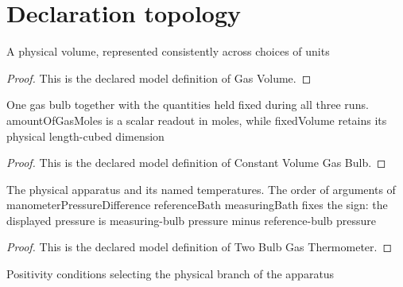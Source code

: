 \section{Declaration topology}
\begin{definition}
  \label{def:physics:phyx-mini-0157:phyxminiproblems-problemphyxmini0157-gasvolume}
  A physical volume, represented consistently across choices of units
\end{definition}
\begin{proof}
  This is the declared model definition of Gas Volume.
\end{proof}
\begin{definition}
  \label{def:physics:phyx-mini-0157:phyxminiproblems-problemphyxmini0157-constantvolumegasbulb}
  One gas bulb together with the quantities held fixed during all three runs. amountOfGasMoles is a scalar readout in moles, while fixedVolume retains its physical length-cubed dimension
\end{definition}
\begin{proof}
  This is the declared model definition of Constant Volume Gas Bulb.
\end{proof}
\begin{definition}
  \label{def:physics:phyx-mini-0157:phyxminiproblems-problemphyxmini0157-twobulbgasthermometer}
  The physical apparatus and its named temperatures. The order of arguments of manometerPressureDifference referenceBath measuringBath fixes the sign: the displayed pressure is measuring-bulb pressure minus reference-bulb pressure
\end{definition}
\begin{proof}
  This is the declared model definition of Two Bulb Gas Thermometer.
\end{proof}
\begin{definition}
  \label{def:physics:phyx-mini-0157:phyxminiproblems-problemphyxmini0157-hasphysicalgasthermometerparameters}
  Positivity conditions selecting the physical branch of the apparatus
\end{definition}
